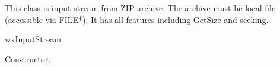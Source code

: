 %
%


\section{}\label{wxzipinputstream}

This class is input stream from ZIP archive. The archive
must be local file (accessible via FILE*).
It has all features including GetSize and seeking.


wxInputStream




\label{wxzipinputstreamwxzipinputstream}


Constructor.





